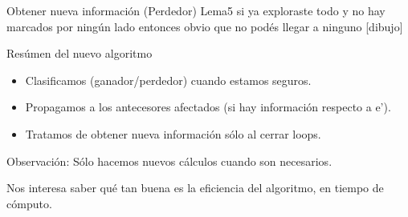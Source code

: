 \begin{frame}{Obtener nueva información (Perdedor)}
    Lema5 si ya exploraste todo y no hay marcados por ningún lado entonces obvio que no podés llegar a ninguno [dibujo]
\end{frame}
\begin{frame}{Resúmen del nuevo algoritmo}
    \begin{itemize}
     \item Clasificamos (ganador/perdedor) cuando estamos seguros. %
     \item Propagamos a los antecesores afectados (si hay información respecto a e').
     \item Tratamos de obtener nueva información sólo al cerrar loops.
    \end{itemize}
    
    \begin{block}{Observación:}
        Sólo hacemos nuevos cálculos cuando son necesarios.
    \end{block}
    
    Nos interesa saber qué tan buena es la eficiencia del algoritmo, en tiempo de cómputo.
\end{frame}


